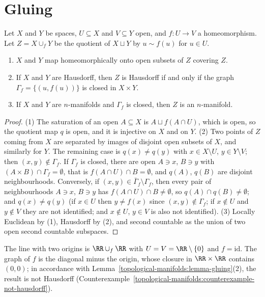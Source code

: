 \section{Gluing}\label{topological-manifolds:section-gluing}

\begin{lemma}\label{topological-manifolds:lemma-gluing}
Let $X$ and $Y$ be spaces, $U \subseteq X$ and $V \subseteq Y$ open, and $f \colon U \to V$ a homeomorphism. Let $Z = X \cup_fY$ be the quotient of $X \sqcup Y$ by $u \sim f(u)$ for $u \in U$.
\begin{enumerate}
\item $X$ and $Y$ map homeomorphically onto open subsets of $Z$ covering $Z$.
\item If $X$ and $Y$ are Hausdorff, then $Z$ is Hausdorff if and only if the graph $\Gamma_f = \{(u, f(u))\}$ is closed in $X \times Y$.
\item If $X$ and $Y$ are $n$-manifolds and $\Gamma_f$ is closed, then $Z$ is an $n$-manifold.
\end{enumerate}
\end{lemma}

\begin{proof}
(1) The saturation of an open $A \subseteq X$ is $A \sqcup f(A \cap U)$, which is open, so the quotient map $q$ is open, and it is injective on $X$ and on $Y$. (2) Two points of $Z$ coming from $X$ are separated by images of
disjoint open subsets of $X$, and similarly for $Y$. The remaining case is $q(x) \neq q(y)$ with $x \in X \setminus U$, $y \in Y \setminus V$; then $(x, y) \notin \Gamma_f$. If $\Gamma_f$ is closed, there are open $A \ni x$, $B \ni y$ with
$(A \times B) \cap \Gamma_f = \emptyset$, that is $f(A \cap U) \cap B = \emptyset$, and $q(A)$, $q(B)$ are disjoint neighbourhoods. Conversely, if $(x, y) \in \bar\Gamma_f \setminus \Gamma_f$, then every pair of neighbourhoods $A \ni x$,
$B \ni y$ has $f(A \cap U) \cap B \neq \emptyset$, so $q(A) \cap q(B) \neq \emptyset$; and $q(x) \neq q(y)$ (if $x \in U$ then $y \neq f(x)$ since $(x, y) \notin \Gamma_f$; if $x \notin U$ and $y \notin V$ they are not identified; and $x \notin U$,
$y \in V$ is also not identified). (3) Locally Euclidean by (1), Hausdorff by (2), and second countable as the union of two open second countable subspaces.
\end{proof}

\begin{counterexample}\label{topological-manifolds:counterexample-gluing}
The line with two origins is $\RR \cup_f\RR$ with $U = V = \RR \setminus \{0\}$ and $f = \mathrm{id}$. The graph of $f$ is the diagonal minus the origin, whose closure in $\RR \times \RR$ contains $(0, 0)$; in accordance with
Lemma~\ref{topological-manifolds:lemma-gluing}(2), the result is not Hausdorff (Counterexample~\ref{topological-manifolds:counterexample-not-hausdorff}).
\end{counterexample}

